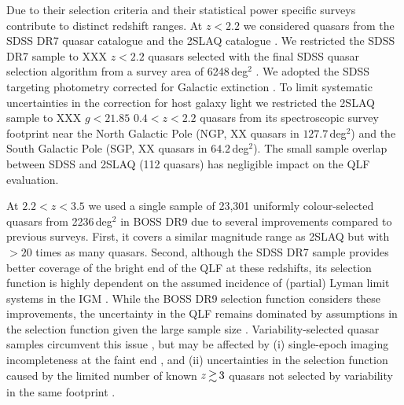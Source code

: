 \documentclass[a4paper,fleqn,usenatbib]{mnras}
\begin{document}
Due to their selection criteria and their statistical power specific
surveys contribute to distinct redshift ranges. At $z<2.2$ we
considered quasars from the SDSS DR7 quasar catalogue
\citep{2010AJ....139.2360S} and the 2SLAQ catalogue
\citep{2009MNRAS.392...19C}. We restricted the SDSS DR7 sample to XXX
$z<2.2$ quasars selected with the final SDSS quasar selection
algorithm \citep{2002AJ....123.2945R, 2006AJ....131.2766R} from a
survey area of 6248\,deg$^2$ \citep{2012ApJ...746..169S}. We adopted
the SDSS targeting photometry corrected for Galactic extinction
\citep{2010AJ....139.2360S}. To limit systematic uncertainties in the
correction for host galaxy light \citep{2009MNRAS.392...19C} we
restricted the 2SLAQ sample to XXX $g<21.85$ $0.4<z<2.2$ quasars from
its spectroscopic survey footprint near the North Galactic Pole (NGP,
XX quasars in $127.7$\,deg$^2$) and the South Galactic Pole (SGP, XX
quasars in $64.2$\,deg$^2$). The small sample overlap between SDSS and
2SLAQ (112 quasars) has negligible impact on the QLF evaluation.

At $2.2<z<3.5$ we used a single sample of 23,301 uniformly
colour-selected quasars from 2236\,deg$^2$ in BOSS DR9
\citep{2013ApJ...773...14R} due to several improvements compared to
previous surveys. First, it covers a similar magnitude range as 2SLAQ
but with $>20$ times as many quasars. Second, although the SDSS DR7
sample provides better coverage of the bright end of the QLF at these
redshifts, its selection function is highly dependent on the assumed
incidence of (partial) Lyman limit systems in the IGM
\citep{2009ApJ...705L.113P, 2011ApJ...728...23W}. While the BOSS DR9
selection function considers these improvements, the uncertainty in
the QLF remains dominated by assumptions in the selection function
given the large sample size
\citep{2013ApJ...773...14R}. Variability-selected quasar samples
circumvent this issue \citep{2013ApJ...773...14R, 2013A&A...551A..29P,
  2016A&A...587A..41P}, but may be affected by (i) single-epoch
imaging incompleteness at the faint end \citep{2013ApJ...773...14R},
and (ii) uncertainties in the selection function caused by the limited
number of known $z\ga 3$ quasars not selected by variability in the
same footprint \citep{2013A&A...551A..29P, 2016A&A...587A..41P}.
\end{document}
